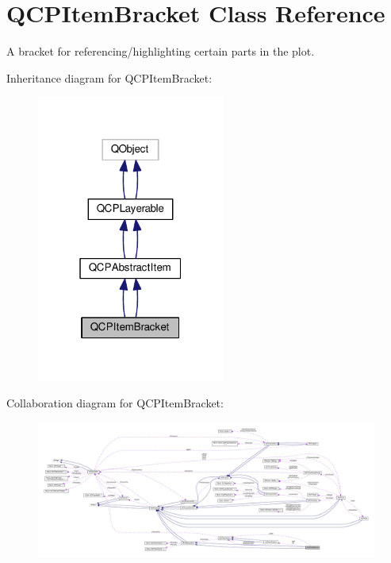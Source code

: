 \hypertarget{class_q_c_p_item_bracket}{}\section{Q\+C\+P\+Item\+Bracket Class Reference}
\label{class_q_c_p_item_bracket}


A bracket for referencing/highlighting certain parts in the plot.  




Inheritance diagram for Q\+C\+P\+Item\+Bracket\+:\nopagebreak
\begin{figure}[H]
\begin{center}
\leavevmode
\includegraphics[width=175pt]{class_q_c_p_item_bracket__inherit__graph}
\end{center}
\end{figure}


Collaboration diagram for Q\+C\+P\+Item\+Bracket\+:\nopagebreak
\begin{figure}[H]
\begin{center}
\leavevmode
\includegraphics[width=350pt]{class_q_c_p_item_bracket__coll__graph}
\end{center}
\end{figure}
